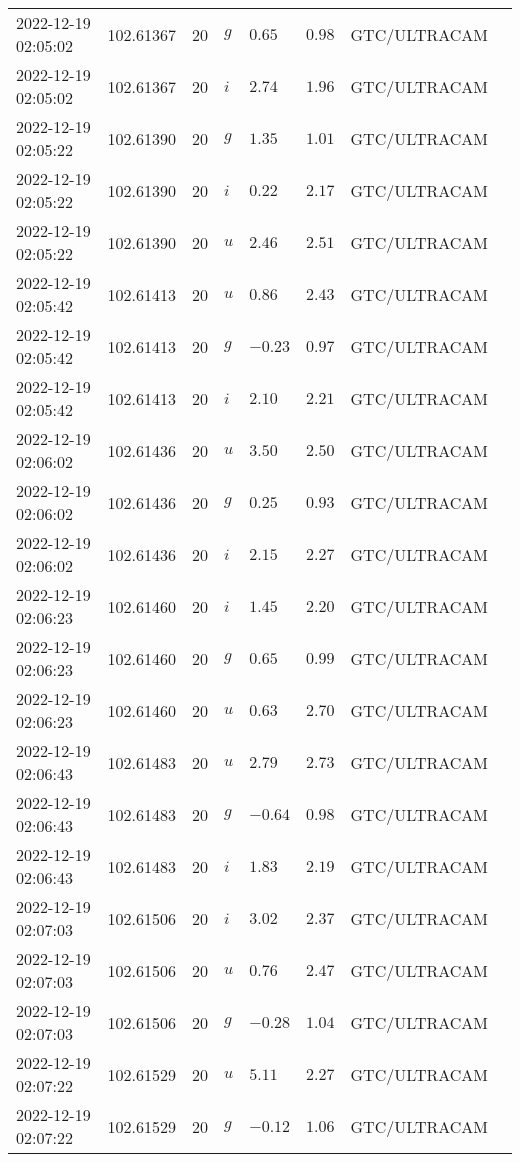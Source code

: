 \documentclass{nature_plusfigure}
\begin{document}
\begin{supplement}
\begin{center}
\begin{longtable}{llllllll}
2022-12-19 02:05:02 & 102.61367 & 20 & $g$ & $0.65$ & $0.98$ & GTC/ULTRACAM &  \\ 
2022-12-19 02:05:02 & 102.61367 & 20 & $i$ & $2.74$ & $1.96$ & GTC/ULTRACAM &  \\ 
2022-12-19 02:05:22 & 102.61390 & 20 & $g$ & $1.35$ & $1.01$ & GTC/ULTRACAM &  \\ 
2022-12-19 02:05:22 & 102.61390 & 20 & $i$ & $0.22$ & $2.17$ & GTC/ULTRACAM &  \\ 
2022-12-19 02:05:22 & 102.61390 & 20 & $u$ & $2.46$ & $2.51$ & GTC/ULTRACAM &  \\ 
2022-12-19 02:05:42 & 102.61413 & 20 & $u$ & $0.86$ & $2.43$ & GTC/ULTRACAM &  \\ 
2022-12-19 02:05:42 & 102.61413 & 20 & $g$ & $-0.23$ & $0.97$ & GTC/ULTRACAM &  \\ 
2022-12-19 02:05:42 & 102.61413 & 20 & $i$ & $2.10$ & $2.21$ & GTC/ULTRACAM &  \\ 
2022-12-19 02:06:02 & 102.61436 & 20 & $u$ & $3.50$ & $2.50$ & GTC/ULTRACAM &  \\ 
2022-12-19 02:06:02 & 102.61436 & 20 & $g$ & $0.25$ & $0.93$ & GTC/ULTRACAM &  \\ 
2022-12-19 02:06:02 & 102.61436 & 20 & $i$ & $2.15$ & $2.27$ & GTC/ULTRACAM &  \\ 
2022-12-19 02:06:23 & 102.61460 & 20 & $i$ & $1.45$ & $2.20$ & GTC/ULTRACAM &  \\ 
2022-12-19 02:06:23 & 102.61460 & 20 & $g$ & $0.65$ & $0.99$ & GTC/ULTRACAM &  \\ 
2022-12-19 02:06:23 & 102.61460 & 20 & $u$ & $0.63$ & $2.70$ & GTC/ULTRACAM &  \\ 
2022-12-19 02:06:43 & 102.61483 & 20 & $u$ & $2.79$ & $2.73$ & GTC/ULTRACAM &  \\ 
2022-12-19 02:06:43 & 102.61483 & 20 & $g$ & $-0.64$ & $0.98$ & GTC/ULTRACAM &  \\ 
2022-12-19 02:06:43 & 102.61483 & 20 & $i$ & $1.83$ & $2.19$ & GTC/ULTRACAM &  \\ 
2022-12-19 02:07:03 & 102.61506 & 20 & $i$ & $3.02$ & $2.37$ & GTC/ULTRACAM &  \\ 
2022-12-19 02:07:03 & 102.61506 & 20 & $u$ & $0.76$ & $2.47$ & GTC/ULTRACAM &  \\ 
2022-12-19 02:07:03 & 102.61506 & 20 & $g$ & $-0.28$ & $1.04$ & GTC/ULTRACAM &  \\ 
2022-12-19 02:07:22 & 102.61529 & 20 & $u$ & $5.11$ & $2.27$ & GTC/ULTRACAM &  \\ 
2022-12-19 02:07:22 & 102.61529 & 20 & $g$ & $-0.12$ & $1.06$ & GTC/ULTRACAM &  \\ 

\end{longtable}
\end{center}
\end{supplement}
\end{document}

